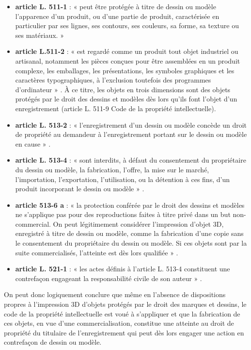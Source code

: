 \documentclass{article}
\begin{document}
\begin{itemize}
\item \textbf{article L. 511-1} : « peut être protégée à titre de dessin ou modèle l'apparence d'un produit, ou d'une partie de produit, caractérisée en particulier par ses lignes, ses contours, ses couleurs, sa forme, sa texture ou ses matériaux. »
\item \textbf{article L.511-2} : « est regardé comme un produit tout objet industriel ou artisanal, notamment les pièces conçues pour être assemblées en un produit complexe, les emballages, les présentations, les symboles graphiques et les caractères typographiques, à l'exclusion toutefois des programmes d'ordinateur » . À ce titre, les objets en trois dimensions sont des objets protégés par le droit des dessins et modèles
dès lors qu'ils font l'objet d'un enregistrement (article L. 511-9 Code de la propriété intellectuelle).
\item \textbf{article L. 513-2} : « l'enregistrement d'un dessin ou modèle concède un droit de propriété au demandeur à l'enregistrement portant sur le dessin ou modèle en cause » .
\item \textbf{article L. 513-4} : « sont interdits, à défaut du consentement du propriétaire du dessin ou modèle, la fabrication, l'offre, la mise sur le marché, l'importation, l'exportation, l'utilisation, ou la détention à ces fins, d'un produit incorporant le dessin ou modèle » .
\item \textbf{article 513-6 a} : « la protection conférée par le droit des dessins et modèles ne s'applique pas pour des reproductions faites à titre privé dans un but non-commercial. On peut légitimement considérer l'impression d'objet 3D, enregistré à titre de dessin ou modèle, comme la fabrication d'une copie sans le consentement du propriétaire du dessin ou modèle. Si ces objets sont par la suite commercialisés, l'atteinte est dès lors qualifiée » .
\item \textbf{article L. 521-1} : « les actes définis à l'article L. 513-4 constituent une contrefaçon engageant la responsabilité civile de son auteur » .
\end{itemize}
 \par\leavevmode\par
On peut donc logiquement conclure que même en l'absence de dispositions propres à l'impression 3D
d'objets protégés par le droit des marques et dessins, le code de la propriété intellectuelle est voué à
s'appliquer et que la fabrication de ces objets, en vue d'une commercialisation, constitue une atteinte
au droit de propriété du titulaire de l'enregistrement qui peut dès lors engager une action en
contrefaçon de dessin ou modèle.
 \par\leavevmode\par
\end{document}
